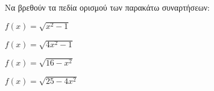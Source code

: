 Να βρεθούν τα πεδία ορισμού των παρακάτω συναρτήσεων:
\begin{alist}
\item $ f(x)=\sqrt{x^2-1} $
\item $ f(x)=\sqrt{4x^2-1} $
\item $ f(x)=\sqrt{16-x^2} $
\item $ f(x)=\sqrt{25-4x^2} $
\end{alist}
